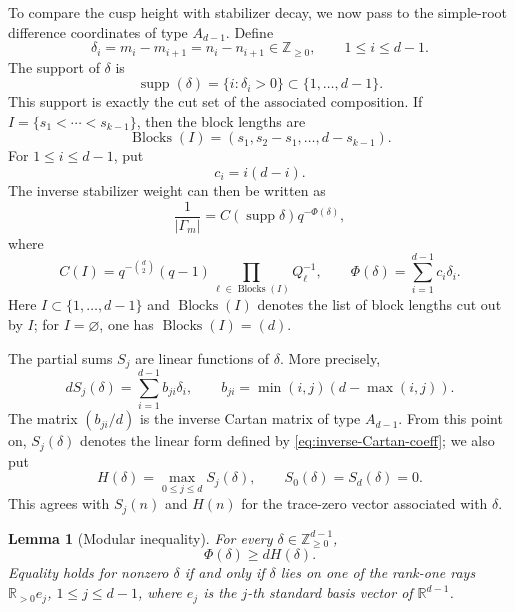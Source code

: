 \documentclass[11pt]{amsart}
\newcommand{\ZZ}{\mathbb Z}
\newcommand{\RR}{\mathbb R}
\newcommand{\supp}{\operatorname{supp}}
\newcommand{\Blocks}{\operatorname{Blocks}}
\theoremstyle{plain}
\newtheorem{lemma}[theorem]{Lemma}
\theoremstyle{definition}
\numberwithin{equation}{section}
\begin{document}
To compare the cusp height with stabilizer decay, we now pass to the simple-root
difference coordinates of type \(A_{d-1}\).  Define
\begin{equation}\label{eq:delta-coordinates}
  \delta_i=m_i-m_{i+1}=n_i-n_{i+1}\in\ZZ_{\ge0},
  \qquad 1\le i\le d-1.
\end{equation}
The support of $\delta$ is
\[
  \supp(\delta)=\{i:\delta_i>0\}\subset\{1,\ldots,d-1\}.
\]
This support is exactly the cut set of the associated composition.  If
$I=\{s_1<\cdots<s_{k-1}\}$, then the block lengths are
\[
  \Blocks(I)=(s_1,s_2-s_1,\ldots,d-s_{k-1}).
\]
For $1\le i\le d-1$, put
\begin{equation}\label{eq:c_i}
  c_i=i(d-i).
\end{equation}
The inverse stabilizer weight can then be written as
\begin{equation}\label{eq:weight-delta}
  \frac1{|\Gamma_m|}=C(\supp\delta)q^{-\Phi(\delta)},
\end{equation}
where
\begin{equation}\label{eq:C-I-Phi}
  C(I)=q^{-\binom d2}(q-1)\prod_{\ell\in\Blocks(I)}Q_\ell^{-1},
  \qquad
  \Phi(\delta)=\sum_{i=1}^{d-1}c_i\delta_i.
\end{equation}
Here $I\subset\{1,\ldots,d-1\}$ and $\Blocks(I)$ denotes the list of block lengths cut out
by $I$; for $I=\varnothing$, one has $\Blocks(I)=(d)$.

The partial sums $S_j$ are linear functions of $\delta$.  More precisely,
\begin{equation}\label{eq:inverse-Cartan-coeff}
  dS_j(\delta)=\sum_{i=1}^{d-1}b_{ji}\delta_i,
  \qquad
  b_{ji}=\min(i,j)(d-\max(i,j)).
\end{equation}
The matrix $(b_{ji}/d)$ is the inverse Cartan matrix of type $A_{d-1}$.  From this
point on, $S_j(\delta)$ denotes the linear form defined by
\eqref{eq:inverse-Cartan-coeff}; we also put
\begin{equation}\label{eq:H-delta-def}
  H(\delta)=\max_{0\le j\le d}S_j(\delta),
  \qquad S_0(\delta)=S_d(\delta)=0.
\end{equation}
This agrees with $S_j(n)$ and $H(n)$ for the trace-zero vector associated with
$\delta$.

\begin{lemma}[Modular inequality]\label{lem:Phi-dH}
For every $\delta\in\ZZ_{\ge0}^{d-1}$,
\begin{equation}\label{eq:Phi-ge-dH}
  \Phi(\delta)\ge dH(\delta).
\end{equation}
Equality holds for nonzero $\delta$ if and only if $\delta$ lies on one of the rank-one rays
$\RR_{>0}e_j$, $1\le j\le d-1$, where $e_j$ is the $j$-th standard basis vector of
$\RR^{d-1}$.
\end{lemma}
\end{document}
